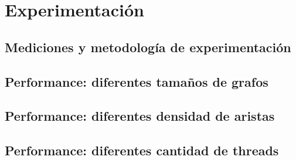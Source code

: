 \section{Experimentación}
\subsection{Mediciones y metodología de experimentación}

\subsection{Performance: diferentes tamaños de grafos}

\subsection{Performance: diferentes densidad de aristas}

\subsection{Performance: diferentes cantidad de threads}



